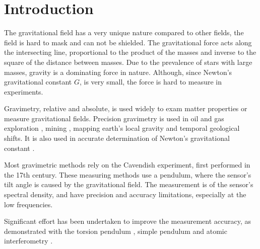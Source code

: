 \documentclass[\main/master.tex]{subfiles}
\begin{document}
\titleformat{\chapter}{\bfseries\LARGE}{\thechapter~}{0em}{}


\chapter{Introduction}\label{chapter:Introduction}


The gravitational field has a very unique nature compared to other fields, the field is hard to mask and can not be shielded. The gravitational force acts along the intersecting line, proportional to the product of the masses and inverse to the square of the distance between masses. Due to the prevalence of stars with large masses, gravity is a dominating force in nature. Although, since Newton's gravitational constant $G$, is very small, the force is hard to measure in experiments. 
\par\noindent
Gravimetry, relative and absolute, is used widely to exam matter properties or measure gravitational fields. Precision gravimetry \cite{Wahr04,Bingham10,Bell98,Leeuwen00,Diorio03,Romaides01,Peters01,Luther82,Kuroda95,Karagioz96,Bagley97,Gundlach00,Quinn01,Armstrong03,Kleinevoss99,Parks10,Peters99,Mcguirk02,Dimopoulos07,Lamporesi08,Sorrentino10,Rosi14,Goodkind99} is used in oil and gas exploration \cite{Bell98}, mining \cite{Leeuwen00}, mapping earth's local gravity \cite{Wahr04,Bingham10} and temporal geological shifts. It is also used in accurate determination of Newton's gravitational constant \cite{Luther82, Kuroda95, Karagioz96, Bagley97, Gundlach00, Quinn01, Armstrong03, Kleinevoss99, Parks10, Peters99, Mcguirk02, Dimopoulos07, Lamporesi08, Sorrentino10, Rosi14}. 
\par\noindent
Most gravimetric methods rely on the Cavendish experiment, first performed in the 17th century. These measuring methods use a pendulum, where the sensor's tilt angle is caused by the gravitational field. The measurement is of the sensor's spectral density, and
have precision and accuracy limitations, especially at the low frequencies. 
\par\noindent
Significant effort has been undertaken to improve the measurement accuracy, as demonstrated with the torsion pendulum \cite{Luther82,Kuroda95,Karagioz96,Bagley97,Gundlach00,Quinn01,Armstrong03}, simple pendulum \cite {Kleinevoss99,Parks10} and atomic interferometry \cite{Lamporesi08,Sorrentino10,Rosi14}.
\iffalse
\end{document}
